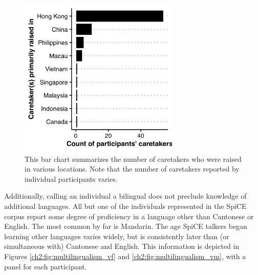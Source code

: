 \begin{figure}[!htbp]
  \begin{center}
  \includegraphics[width=3in]{figures/ch2_caretakers_3in.png} 
  \caption{This bar chart summarizes the number of caretakers who were raised in various locations. Note that the number of caretakers reported by individual participants varies.}
  \label{ch2:fig:caretakers}
  \end{center}
\end{figure}

Additionally, calling an individual a bilingual does not preclude knowledge of additional languages. All but one of the individuals represented in the SpiCE corpus report some degree of proficiency in a language other than Cantonese or English. The most common by far is Mandarin. The age SpiCE talkers began learning other languages varies widely, but is consistently later than (or simultaneous with) Cantonese and English. This information is depicted in Figures \ref{ch2:fig:multilingualism_vf} and \ref{ch2:fig:multilingualism_vm}, with a panel for each participant.

